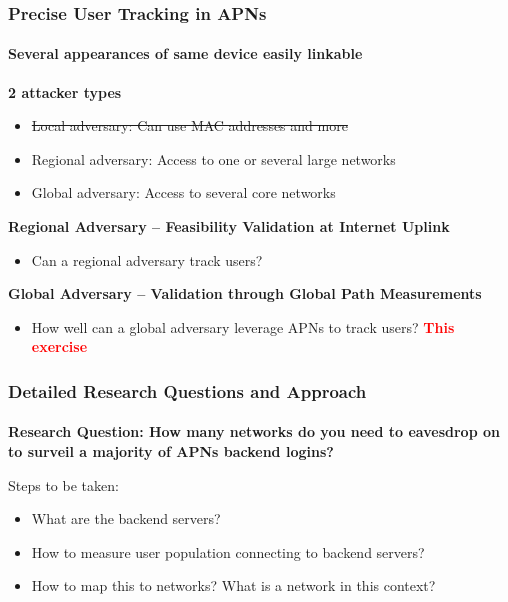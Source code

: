 \begin{frame}
\frametitle{Precise User Tracking in APNs}
\framesubtitle{Several appearances of same device easily linkable}

\textbf{2 attacker types}\\
\begin{itemize}
\item \st{Local adversary: Can use MAC addresses and more}
\item Regional adversary: Access to one or several large networks 
\item Global adversary: Access to several core networks
\end{itemize}

\textbf{Regional Adversary -- Feasibility Validation at Internet Uplink}\\
\begin{itemize}
\item Can a regional adversary track users?  \textcolor{TUMGreen}{\checkmark}
\end{itemize}

\textbf{Global Adversary -- Validation through Global Path Measurements}\\
\begin{itemize}
	\item How well can a global adversary leverage APNs to track users? \textcolor{red}{\textbf{This exercise}}
\end{itemize}

\end{frame}
\clearpage

\begin{frame}
\frametitle{Detailed Research Questions and Approach}
\framesubtitle{}

\textbf{Research Question: How many networks do you need to eavesdrop on to surveil a majority of APNs backend logins?}

Steps to be taken:
\begin{itemize}
	\item What are the backend servers?
	\item How to measure user population connecting to backend servers?
	\item How to map this to networks? What is a network in this context?
\end{itemize}
\end{frame}
\clearpage

